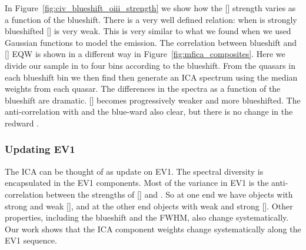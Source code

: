 In Figure~\ref{fig:civ_blueshift_oiii_strength} we show how the [] strength varies as a function of the  blueshift. 
There is a very well defined relation: when  is strongly blueshifted [] is very weak. 
This is very similar to what we found when we used Gaussian functions to model the emission. 
The correlation between  blueshift and [] EQW is shown in a different way in Figure~\ref{fig:mfica_composites}. 
Here we divide our sample in to four bins according to the  blueshift. 
From the quasars in each  blueshift bin we then find then generate an \ac{ICA} spectrum using the median weights from each quasar. 
The differences in the spectra as a function of the  blueshift are dramatic. 
[] becomes progressively weaker and more blueshifted.
The anti-correlation with  and the blue-ward  also clear, but there is no change in the redward . 

\subsubsection{Updating \ac{EV1}}

The \ac{ICA} can be thought of as update on \ac{EV1}. 
The spectral diversity is encapsulated in the \ac{EV1} components. 
Most of the variance in \ac{EV1} is the anti-correlation between the strengths of [] and . 
So at one end we have objects with strong  and weak [], and at the other end objects with weak  and strong []. 
Other properties, including the  blueshift and the \hb FWHM, also change systematically. 
Our work shows that the \ac{ICA} component weights change systematically along the \ac{EV1} sequence. 

